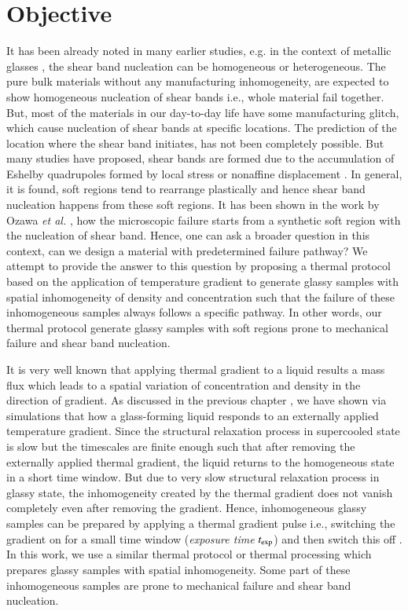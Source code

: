\section{Objective}
It has been already noted in many earlier studies, e.g. in the context of metallic glasses \cite{cheng2011intrinsic,tian2012approaching}, the shear band nucleation can be homogeneous or heterogeneous. The pure bulk materials without any manufacturing inhomogeneity, are expected to show homogeneous nucleation of shear bands i.e., whole material fail together. But, most of the materials in our day-to-day life have some manufacturing glitch, which cause nucleation of shear bands at specific locations. The prediction of the location where the shear band initiates, has not been completely possible. But many studies \cite{hieronymus2017shear,hassani2019probing} have proposed, shear bands are formed due to the accumulation of Eshelby quadrupoles formed by local stress or nonaffine displacement \cite{dasgupta2013yield,falkLanger98}. In general, it is found, soft regions tend to rearrange plastically and hence shear band nucleation happens from these soft regions. It has been shown in the work by Ozawa {\em et al.} \cite{ozawa2022rare}, how the microscopic failure starts from a synthetic soft region with the nucleation of shear band. Hence, one can ask a broader question in this context, can we design a material with predetermined failure pathway? We attempt to provide the answer to this question by proposing a thermal protocol based on the application of temperature gradient to generate glassy samples with spatial inhomogeneity of density and concentration such that the failure of these inhomogeneous samples always follows a specific pathway. In other words, our thermal protocol generate glassy samples with soft regions prone to mechanical failure and shear band nucleation.

It is very well known that applying thermal gradient to a liquid results a mass flux which leads to a spatial variation of concentration and density in the direction of gradient. As discussed in the previous chapter \cite{vaibhav2020response}, we have shown via simulations that how a glass-forming liquid responds to an externally applied temperature gradient. Since the structural relaxation process in supercooled state is slow but the timescales are finite enough such that after removing the externally applied thermal gradient, the liquid returns to the homogeneous state in a short time window. But due to very slow structural relaxation process in glassy state, the inhomogeneity created by the thermal gradient does not vanish completely even after removing the gradient. Hence, inhomogeneous glassy samples can be prepared by applying a thermal gradient pulse i.e., switching the gradient on for a small time window ({\em exposure time} $t_{\rm exp}$) and then switch this off \cite{vaibhav2020response}. In this work, we use a similar thermal protocol or thermal processing which prepares glassy samples with spatial inhomogeneity. Some part of these inhomogeneous samples are prone to mechanical failure and shear band nucleation.

